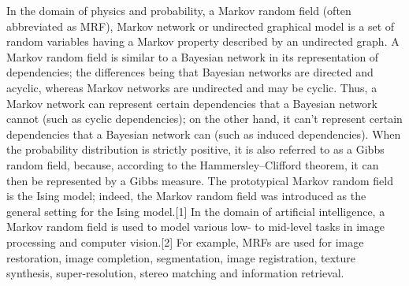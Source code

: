 In the domain of physics and probability, a Markov random field (often abbreviated as MRF), Markov network or undirected graphical model is a set of random variables having a Markov property described by an undirected graph. A Markov random field is similar to a Bayesian network in its representation of dependencies; the differences being that Bayesian networks are directed and acyclic, whereas Markov networks are undirected and may be cyclic. Thus, a Markov network can represent certain dependencies that a Bayesian network cannot (such as cyclic dependencies); on the other hand, it can't represent certain dependencies that a Bayesian network can (such as induced dependencies).
When the probability distribution is strictly positive, it is also referred to as a Gibbs random field, because, according to the Hammersley–Clifford theorem, it can then be represented by a Gibbs measure. The prototypical Markov random field is the Ising model; indeed, the Markov random field was introduced as the general setting for the Ising model.[1] In the domain of artificial intelligence, a Markov random field is used to model various low- to mid-level tasks in image processing and computer vision.[2] For example, MRFs are used for image restoration, image completion, segmentation, image registration, texture synthesis, super-resolution, stereo matching and information retrieval.
